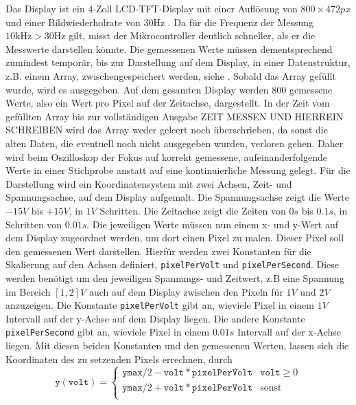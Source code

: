 Das Display ist ein $4$-Zoll LCD-TFT-Display mit einer Auflösung von \newline $800 \times 472 \si{px}$
und einer Bildwiederholrate von 30\si{\hertz} \cite{MikroControllerDatasheet_1}.
Da für die Frequenz der Messung $10 \si{\kilo\hertz} > 30 \si{\hertz}$ gilt,
misst der Mikrocontroller deutlich schneller, als er die Messwerte darstellen könnte.
Die gemessenen Werte müssen dementsprechend zumindest temporär, bis zur Darstellung auf dem Display,
in einer Datenstruktur, z.B. einem Array, zwischengespeichert werden, siehe \cite{Oscilloscope_Code}.
Sobald das Array gefüllt wurde, wird es ausgegeben. \newline
Auf dem gesamten Display werden 800 gemessene Werte, also ein Wert pro Pixel auf der Zeitachse,
dargestellt. \newline
In der Zeit vom gefüllten Array bis zur
vollständigen Ausgabe ZEIT MESSEN UND HIERREIN SCHREIBEN wird das Array weder geleert noch überschrieben,
da sonst die alten Daten, die eventuell noch nicht ausgegeben wurden, verloren gehen.
Daher wird beim Oszilloskop der Fokus auf korrekt gemessene, aufeinanderfolgende Werte in einer
Stichprobe anstatt auf eine kontinuierliche Messung gelegt.
\newline \newline
Für die Darstellung wird ein Koordinatensystem mit zwei Achsen, Zeit- und Spannungsachse,
auf dem Display aufgemalt.
Die Spannungsachse zeigt die Werte $-15V$ bis $+15V$, in $1V$ Schritten.
Die Zeitachse zeigt die Zeiten von $0s$ bis $0.1s$, in Schritten von $0.01s$.
Die jeweiligen Werte müssen nun einem x- und y-Wert auf dem Display zugeordnet werden,
um dort einen Pixel zu malen. Dieser Pixel soll den gemessenen Wert darstellen. \newline
Hierfür werden zwei Konstanten für die Skalierung auf den Achsen definiert,
\texttt{pixelPerVolt} und \texttt{pixelPerSecond}.
Diese werden benötigt um den jeweiligen Spannungs- und Zeitwert, z.B eine Spannung im Bereich
$[1,2]V$ auch auf dem Display zwischen den Pixeln für $1V$ und $2V$ anzuzeigen.
Die Konstante \texttt{pixelPerVolt} gibt an, wieviele Pixel in einem $1V$ Intervall auf der
y-Achse auf dem Display liegen.
Die andere Konstante \texttt{pixelPerSecond} gibt an, wieviele Pixel in einem $0.01s$ Intervall
auf der x-Achse liegen. \newline
Mit diesen beiden Konstanten und den gemessenen Werten, lassen sich die Koordinaten des zu setzenden
Pixels errechnen, durch
$$
\texttt{y}(\texttt{volt}) = \begin{cases}
	\texttt{ymax}/2 - \texttt{volt} * \texttt{pixelPerVolt} & \texttt{volt} \ge 0 \\
	\texttt{ymax}/2 + \texttt{volt} * \texttt{pixelPerVolt} & \text{sonst} \\
\end{cases}
$$
